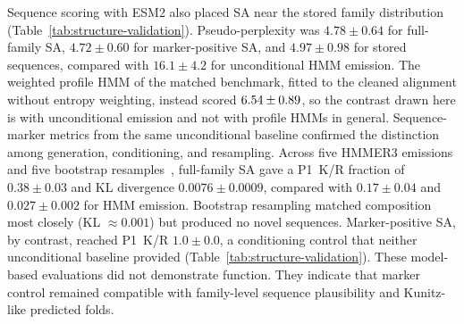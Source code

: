 Sequence scoring with ESM2 also placed SA near the stored family distribution
(Table~\ref{tab:structure-validation}). Pseudo-perplexity was $4.78\pm0.64$ for full-family SA,
$4.72\pm0.60$ for marker-positive SA, and $4.97\pm0.98$ for stored sequences, compared with
$16.1\pm4.2$ for unconditional HMM emission. The weighted profile HMM of the matched benchmark,
fitted to the cleaned alignment without entropy weighting, instead scored
$6.54\pm0.89$, so the contrast drawn here is with
unconditional emission and not with profile HMMs in general.
Sequence-marker metrics from the same unconditional baseline confirmed the distinction among
generation, conditioning, and resampling. Across five HMMER3 emissions and five bootstrap
resamples~\cite{hmmer3}, full-family SA gave a P1~K/R fraction of $0.38\pm0.03$ and KL divergence
$0.0076\pm0.0009$, compared with $0.17\pm0.04$ and $0.027\pm0.002$ for HMM emission.
Bootstrap resampling matched composition most closely (KL $\approx0.001$) but produced no novel
sequences. Marker-positive SA, by contrast, reached P1~K/R $1.0\pm0.0$, a conditioning control
that neither unconditional baseline provided (Table~\ref{tab:structure-validation}). These
model-based evaluations did not demonstrate function. They indicate that marker control remained
compatible with family-level sequence plausibility and Kunitz-like predicted folds.

\DisplayModelValidation
